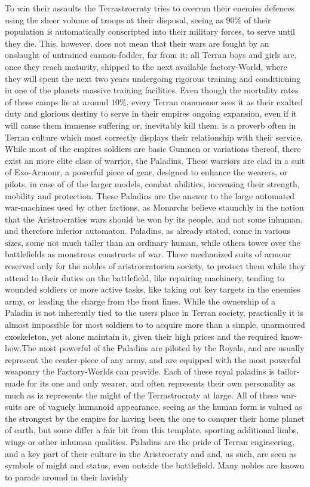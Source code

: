\documentclass[a4paper,12pt]{report}
\begin{document}
To win their assaults the Terrastrocraty tries to overrun their enemies defences using the sheer volume of troops at their disposal, seeing as 90\% of their population is automatically conscripted into their military forces, to serve until they die. This, however, does  not mean that their wars are fought by an onslaught of untrained cannon-fodder, far from it: all Terran boys and girls are, once they reach maturity, shipped to the next available factory-World, where they will spent the next two years undergoing rigorous training and conditioning in one of the planets massive training facilities. Even though the mortality rates of these camps lie at around 10\%, every Terran commoner sees it as their exalted duty and glorious destiny to serve in their empires ongoing expansion, even if it will cause them immense suffering or, inevitably kill them.  is a proverb often in Terran culture which most correctly displays their relationship with their service. While most of the empires soldiers are basic Gunmen or variations thereof, there exist an more elite class of warrior, the Paladins. These warriors are clad in a suit of Exo-Armour, a powerful piece of gear, designed to enhance the wearers, or pilots, in case of of the larger models, combat abilities, increasing their strength, mobility and protection. These Paladins are the answer to the large automated war-machines used by other factions, as Monarchs believe staunchly in the notion that the Aristrocraties wars should be won by its people, and not some inhuman, and therefore inferior automaton. Paladins, as already stated, come in various sizes, some not much taller than an ordinary human, while others tower over the battlefields as monstrous constructs of war. These mechanized suits of armour reserved only for the nobles of aristrocratorien society, to protect them while they attend to their duties on the battlefield, like repairing machinery, tending to wounded soldiers or more active tasks, like taking out key targets in the enemies army, or leading the charge from the front lines. While the ownership of a Paladin is not inherently tied to the users place in Terran society, practically it is almost impossible for most soldiers to to acquire more than a simple, unarmoured exoskeleton, yet alone maintain it, given their high prices and the required know-how.The most powerful of the Paladins are piloted by the Royals, and are usually represent the center-piece of any army, and are equipped with the most powerful weaponry the Factory-Worlds can provide. Each of these royal paladins is tailor-made for its one and only wearer, and often represents their own personality as much as iz represents the might of the Terrastrocraty at large. All of these war-suits are of vaguely humanoid appearance, seeing as the human form is  valued as the strongest by the empire for having been the one to conquer their home planet of earth, but some differ a fair bit from this template, sporting additional limbs, wings or other inhuman qualities. Paladins are the pride of Terran engineering, and a key part of their culture in the Aristrocraty and and, as such, are seen as symbols of might and status, even outside the battlefield. Many nobles are known to parade around in their lavishly 
\end{document}
